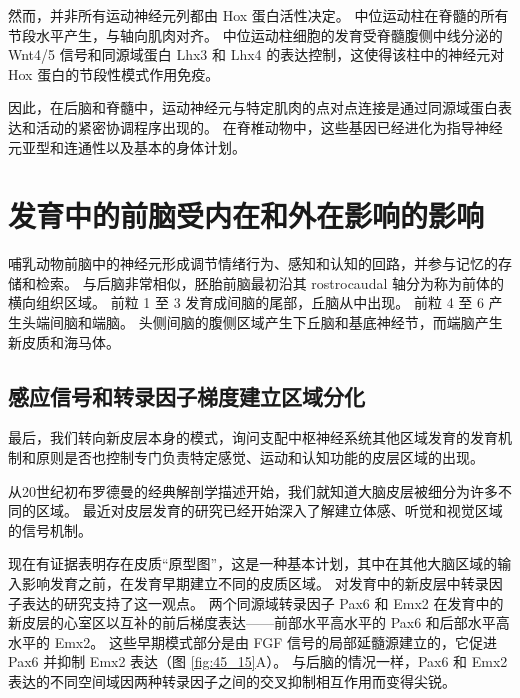 然而，并非所有运动神经元列都由 Hox 蛋白活性决定。 中位运动柱在脊髓的所有节段水平产生，与轴向肌肉对齐。 中位运动柱细胞的发育受脊髓腹侧中线分泌的 Wnt4/5 信号和同源域蛋白 Lhx3 和 Lhx4 的表达控制，这使得该柱中的神经元对 Hox 蛋白的节段性模式作用免疫。

因此，在后脑和脊髓中，运动神经元与特定肌肉的点对点连接是通过同源域蛋白表达和活动的紧密协调程序出现的。 在脊椎动物中，这些基因已经进化为指导神经元亚型和连通性以及基本的身体计划。


\section{发育中的前脑受内在和外在影响的影响}
哺乳动物前脑中的神经元形成调节情绪行为、感知和认知的回路，并参与记忆的存储和检索。 与后脑非常相似，胚胎前脑最初沿其 rostrocaudal 轴分为称为前体的横向组织区域。 前粒 1 至 3 发育成间脑的尾部，丘脑从中出现。 前粒 4 至 6 产生头端间脑和端脑。 头侧间脑的腹侧区域产生下丘脑和基底神经节，而端脑产生新皮质和海马体。

\subsection{感应信号和转录因子梯度建立区域分化}
最后，我们转向新皮层本身的模式，询问支配中枢神经系统其他区域发育的发育机制和原则是否也控制专门负责特定感觉、运动和认知功能的皮层区域的出现。

从20世纪初布罗德曼的经典解剖学描述开始，我们就知道大脑皮层被细分为许多不同的区域。 最近对皮层发育的研究已经开始深入了解建立体感、听觉和视觉区域的信号机制。

现在有证据表明存在皮质“原型图”，这是一种基本计划，其中在其他大脑区域的输入影响发育之前，在发育早期建立不同的皮质区域。 对发育中的新皮层中转录因子表达的研究支持了这一观点。 两个同源域转录因子 Pax6 和 Emx2 在发育中的新皮层的心室区以互补的前后梯度表达——前部水平高水平的 Pax6 和后部水平高水平的 Emx2。 
这些早期模式部分是由 FGF 信号的局部延髓源建立的，它促进 Pax6 并抑制 Emx2 表达（图 \ref{fig:45_15}A）。 
与后脑的情况一样，Pax6 和 Emx2 表达的不同空间域因两种转录因子之间的交叉抑制相互作用而变得尖锐。

